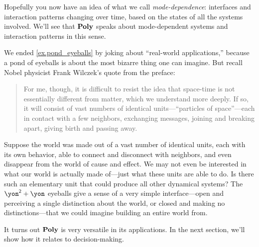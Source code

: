 \documentclass[Book-Poly]{subfiles}
\begin{document}
Hopefully you now have an idea of what we call \emph{mode-dependence}: interfaces and interaction patterns changing over time, based on the states of all the systems involved. We'll see that $\mathbf{Poly}$ speaks about mode-dependent systems and interaction patterns in this sense. 

\begin{remark}
We ended \cref{ex.pond_eyeballs} by joking about ``real-world applications,'' because a pond of eyeballs is about the most bizarre thing one can imagine. But recall Nobel physicist Frank Wilczek's quote from the preface:
\begin{quote}
For me, though, it is difficult to resist the idea that space-time is not essentially different from matter, which we understand more deeply. If so, it will consist of vast numbers of identical units---``particles of space''---each in contact with a few neighbors, exchanging messages, joining and breaking apart, giving birth and passing away.
\end{quote}
Suppose the world was made out of a vast number of identical units, each with its own behavior, able to connect and disconnect with neighbors, and even disappear from the world of cause and effect. We may not even be interested in what our world is actually made of---just what these units are able to do. Is there such an elementary unit that could produce all other dynamical systems? The $\yon^\2+\yon$ eyeballs give a sense of a very simple interface---open and perceiving a single distinction about the world, or closed and making no distinctions---that we could imagine building an entire world from.
\end{remark}

It turns out $\mathbf{Poly}$ is very versatile in its applications. In the next section, we'll show how it relates to decision-making.

\end{document}
